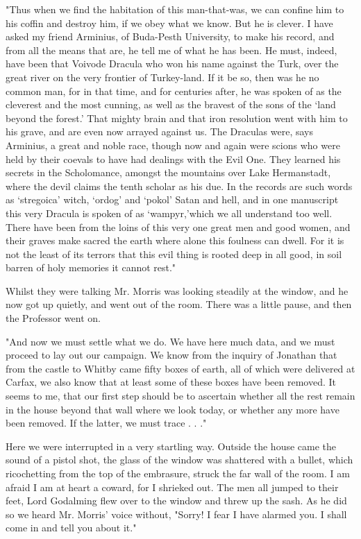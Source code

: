 "Thus when we find the habitation of this man-that-was, we can confine him to his coffin and destroy him, if we obey what we know. But he is clever. I have asked my friend Arminius, of Buda-Pesth University, to make his record, and from all the means that are, he tell me of what he has been. He must, indeed, have been that Voivode Dracula who won his name against the Turk, over the great river on the very frontier of Turkey-land. If it be so, then was he no common man, for in that time, and for centuries after, he was spoken of as the cleverest and the most cunning, as well as the bravest of the sons of the `land beyond the forest.' That mighty brain and that iron resolution went with him to his grave, and are even now arrayed against us. The Draculas were, says Arminius, a great and noble race, though now and again were scions who were held by their coevals to have had dealings with the Evil One. They learned his secrets in the Scholomance, amongst the mountains over Lake Hermanstadt, where the devil claims the tenth scholar as his due. In the records are such words as `stregoica' witch, `ordog' and `pokol' Satan and hell, and in one manuscript this very Dracula is spoken of as `wampyr,'which we all understand too well. There have been from the loins of this very one great men and good women, and their graves make sacred the earth where alone this foulness can dwell. For it is not the least of its terrors that this evil thing is rooted deep in all good, in soil barren of holy memories it cannot rest." 

Whilst they were talking Mr. Morris was looking steadily at the window, and he now got up quietly, and went out of the room. There was a little pause, and then the Professor went on. 

"And now we must settle what we do. We have here much data, and we must proceed to lay out our campaign. We know from the inquiry of Jonathan that from the castle to Whitby came fifty boxes of earth, all of which were delivered at Carfax, we also know that at least some of these boxes have been removed. It seems to me, that our first step should be to ascertain whether all the rest remain in the house beyond that wall where we look today, or whether any more have been removed. If the latter, we must trace . . ." 

Here we were interrupted in a very startling way. Outside the house came the sound of a pistol shot, the glass of the window was shattered with a bullet, which ricochetting from the top of the embrasure, struck the far wall of the room. I am afraid I am at heart a coward, for I shrieked out. The men all jumped to their feet, Lord Godalming flew over to the window and threw up the sash. As he did so we heard Mr. Morris' voice without, "Sorry! I fear I have alarmed you. I shall come in and tell you about it." 


